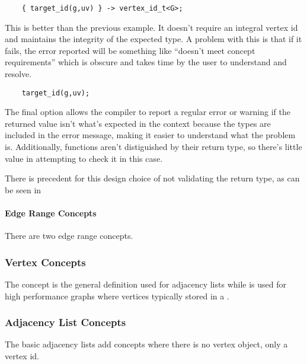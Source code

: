 \begin{lstlisting}
    { target_id(g,uv) } -> vertex_id_t<G>;
\end{lstlisting}
This is better than the previous example. It doesn’t require an integral vertex id and maintains the integrity of the expected type. 
A problem with this is that if it fails, the error reported will be something like “doesn’t meet concept requirements” which is 
obscure and takes time by the user to understand and resolve.

\begin{lstlisting}
    target_id(g,uv);
\end{lstlisting}
The final option allows the compiler to report a regular error or warning if the returned value isn't what's expected in the 
context because the types are included in the error message, making it easier to understand what the problem is.
Additionally, functions aren't distiguished by their return type, so there's little value in attempting to check it in this case.

There is precedent for this design choice of not validating the return type, as can be seen in 
\href{https://en.cppreference.com/w/cpp/ranges/sized_range}{}

\paragraph{Edge Range Concepts}

There are two edge range concepts.

{\small
     
}

\subsubsection{Vertex Concepts}
The  concept is the general definition used for adjacency lists while  is used for
high performance graphs where vertices typically stored in a .
{\small
     
}

\subsubsection{Adjacency List Concepts}
The basic adjacency lists add concepts where there is no vertex object, only a vertex id.
{\small
     
}

